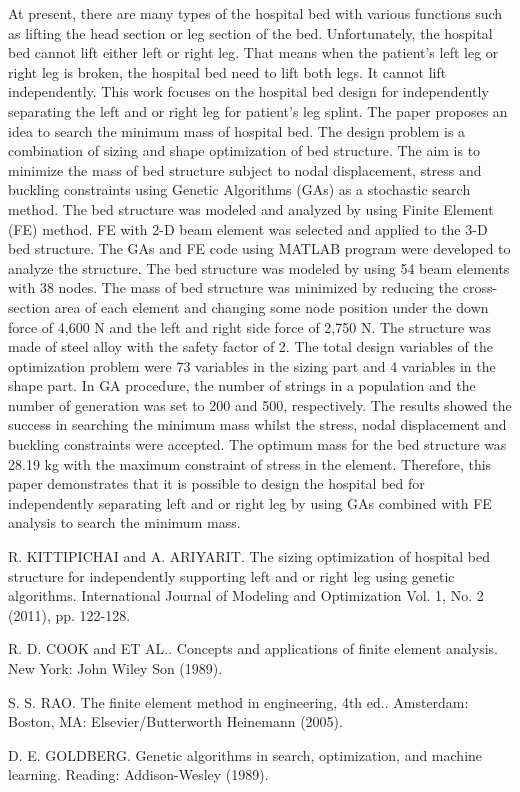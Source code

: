 At present, there are many types of the hospital  bed with various functions such as lifting the head section or leg section of the bed. Unfortunately, the hospital bed cannot lift either left or right leg. That means when the patient's left leg or right leg is broken, the hospital bed need to lift both legs. It cannot lift independently.  This work focuses on the hospital bed design for independently separating the left and or right leg for patient's leg splint. The paper proposes an idea to search the minimum mass of hospital bed. The design problem is a combination of sizing and shape optimization of bed structure. The aim is to minimize the mass of bed structure subject to nodal displacement, stress and buckling constraints using Genetic Algorithms (GAs) as a stochastic search method. The bed structure was modeled and analyzed by using Finite Element (FE) method. FE with 2-D beam element was selected and applied to the 3-D bed structure. The GAs and FE code using MATLAB program were developed to analyze the structure. The bed structure was modeled by using 54 beam elements with 38 nodes. The mass of bed structure was minimized by reducing the cross-section area of each element and changing some node position under the down force of 4,600 N and the left and right side force of 2,750 N. The structure was made of steel alloy with the safety factor of 2. The total design variables of the optimization problem were 73 variables in the sizing part and 4 variables in the shape part.  In GA procedure, the number of strings in a population and the number of generation was set to 200 and 500, respectively. The results showed the success in searching the minimum mass whilst the stress, nodal displacement and buckling constraints were accepted. The optimum mass for the bed structure was 28.19 kg with the maximum constraint of stress in the element. Therefore, this paper demonstrates that it is possible to design the hospital bed for independently separating left and or right leg by using GAs combined with FE analysis to search the minimum mass.


\begin{thebibliography}{10}

{\sc R. KITTIPICHAI and A. ARIYARIT}. {The sizing optimization of hospital bed structure for independently supporting left and or right leg using genetic algorithms}. International Journal of Modeling and Optimization Vol. 1, No. 2 (2011), pp. 122-128.



{\sc R. D. COOK and ET AL.}. {Concepts and applications of finite element analysis}. New York: John Wiley Son (1989).



{\sc S. S. RAO}. {The finite element method in engineering, 4th ed.}. Amsterdam: Boston, MA: Elsevier/Butterworth Heinemann (2005).



{\sc D. E. GOLDBERG}. {Genetic algorithms in search, optimization, and machine learning}. Reading: Addison-Wesley (1989).

\end{thebibliography}


